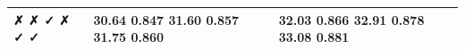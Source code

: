 \begin{tabular}{lll}
\toprule
✗ ✗ ✓ ✗ ✓ ✓ & 30.64 0.847 31.60 0.857 31.75 0.860 & 32.03 0.866 32.91 0.878 33.08 0.881 \\
\midrule
\bottomrule
\end{tabular}
